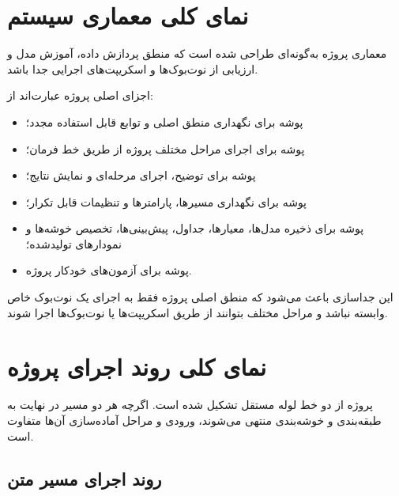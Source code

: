\documentclass[12pt,a4paper,oneside]{report}
\begin{document}
\section{نمای کلی معماری سیستم}

معماری پروژه به‌گونه‌ای طراحی شده است که منطق پردازش داده، آموزش مدل و ارزیابی از نوت‌بوک‌ها و اسکریپت‌های اجرایی جدا باشد.

اجزای اصلی پروژه عبارت‌اند از:

\begin{itemize}

	\item پوشه
	برای نگهداری منطق اصلی و توابع قابل استفاده مجدد؛

	\item پوشه
	برای اجرای مراحل مختلف پروژه از طریق خط فرمان؛

	\item پوشه
	برای توضیح، اجرای مرحله‌ای و نمایش نتایج؛

	\item پوشه
	برای نگهداری مسیرها، پارامترها و تنظیمات قابل تکرار؛

	\item پوشه
	برای ذخیره مدل‌ها، معیارها، جداول، پیش‌بینی‌ها، تخصیص خوشه‌ها و نمودارهای تولیدشده؛

	\item پوشه
	برای آزمون‌های خودکار پروژه.

\end{itemize}

این جداسازی باعث می‌شود که منطق اصلی پروژه فقط به اجرای یک نوت‌بوک خاص وابسته نباشد و مراحل مختلف بتوانند از طریق اسکریپت‌ها یا نوت‌بوک‌ها اجرا شوند.


\section{نمای کلی روند اجرای پروژه}

پروژه از دو خط لوله مستقل تشکیل شده است. اگرچه هر دو مسیر در نهایت به طبقه‌بندی و خوشه‌بندی منتهی می‌شوند، ورودی و مراحل آماده‌سازی آن‌ها متفاوت است.


\subsection{روند اجرای مسیر متن}
\end{document}
